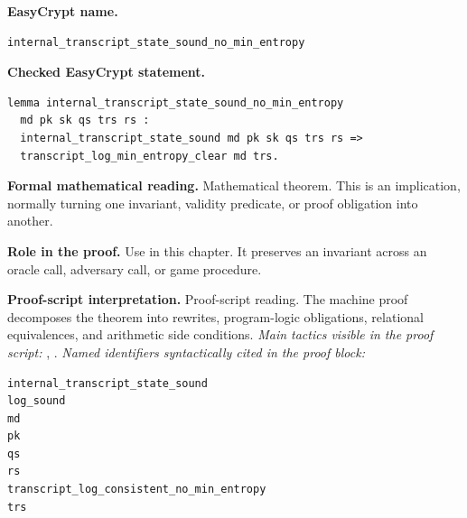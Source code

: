 \begin{formaltheorem}
\noindent\textbf{EasyCrypt name.}
\begin{lstlisting}[language=EasyCrypt,basicstyle=\ttfamily\scriptsize]
internal_transcript_state_sound_no_min_entropy
\end{lstlisting}
\noindent\textbf{Checked EasyCrypt statement.}
\begin{lstlisting}[language=EasyCrypt,basicstyle=\ttfamily\scriptsize]
lemma internal_transcript_state_sound_no_min_entropy
  md pk sk qs trs rs :
  internal_transcript_state_sound md pk sk qs trs rs =>
  transcript_log_min_entropy_clear md trs.
\end{lstlisting}
\noindent\textbf{Formal mathematical reading.}
Mathematical theorem. This is an implication, normally turning one invariant, validity predicate, or proof obligation into another.

\noindent\textbf{Role in the proof.}
Use in this chapter. It preserves an invariant across an oracle call, adversary call, or game procedure.

\noindent\textbf{Proof-script interpretation.}
Proof-script reading. The machine proof decomposes the theorem into rewrites, program-logic obligations, relational equivalences, and arithmetic side conditions.
\emph{Main tactics visible in the proof script:} , .
\emph{Named identifiers syntactically cited in the proof block:}
\begin{lstlisting}[language=EasyCrypt,basicstyle=\ttfamily\scriptsize]
internal_transcript_state_sound
log_sound
md
pk
qs
rs
transcript_log_consistent_no_min_entropy
trs
\end{lstlisting}

\end{formaltheorem}

